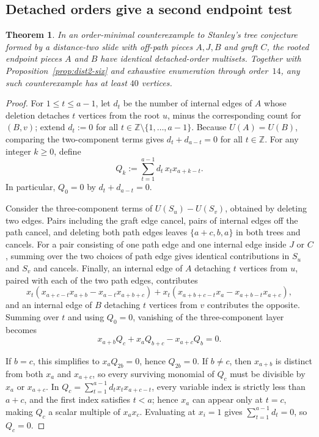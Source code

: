 \documentclass[10pt]{article}
\newtheorem{theorem}{Theorem}[section]
\begin{document}
\subsection{Detached orders give a second endpoint test}

\begin{theorem}\label{thm:dist2-bound}
In an order-minimal counterexample to Stanley's tree conjecture formed by a distance-two slide with off-path pieces $A,J,B$ and graft $C$, the rooted endpoint pieces $A$ and $B$ have identical detached-order multisets. Together with Proposition~\ref{prop:dist2-six} and exhaustive enumeration through order~$14$, any such counterexample has at least $40$ vertices.
\end{theorem}

\begin{proof}
For $1\le t\le a-1$, let $d_t$ be the number of internal edges of $A$ whose deletion detaches $t$ vertices from the root $u$, minus the corresponding count for $(B,v)$; extend $d_t := 0$ for all $t\in\mathbb{Z}\setminus\{1,\ldots,a-1\}$. Because $U(A)=U(B)$, comparing the two-component terms gives $d_t+d_{a-t}=0$ for all $t\in\mathbb{Z}$. For any integer $k\ge 0$, define
\[
Q_k := \sum_{t=1}^{a-1} d_t\, x_t x_{a+k-t}.
\]
In particular, $Q_0 = 0$ by $d_t+d_{a-t}=0$.

Consider the three-component terms of $U(S_u)-U(S_v)$, obtained by deleting two edges. Pairs including the graft edge cancel, pairs of internal edges off the path cancel, and deleting both path edges leaves $\{a+c,b,a\}$ in both trees and cancels. For a pair consisting of one path edge and one internal edge inside $J$ or $C$, summing over the two choices of path edge gives identical contributions in $S_u$ and $S_v$ and cancels. Finally, an internal edge of $A$ detaching $t$ vertices from $u$, paired with each of the two path edges, contributes
\[
x_t(x_{a+c-t}x_{a+b} - x_{a-t}x_{a+b+c}) + x_t(x_{a+b+c-t}x_a - x_{a+b-t}x_{a+c}),
\]
and an internal edge of $B$ detaching $t$ vertices from $v$ contributes the opposite. Summing over $t$ and using $Q_0=0$, vanishing of the three-component layer becomes
\[
x_{a+b}Q_c + x_a Q_{b+c} - x_{a+c}Q_b = 0.
\]

If $b=c$, this simplifies to $x_a Q_{2b}=0$, hence $Q_{2b}=0$. If $b\neq c$, then $x_{a+b}$ is distinct from both $x_a$ and $x_{a+c}$, so every surviving monomial of $Q_c$ must be divisible by $x_a$ or $x_{a+c}$. In $Q_c=\sum_{t=1}^{a-1} d_t x_t x_{a+c-t}$, every variable index is strictly less than $a+c$, and the first index satisfies $t<a$; hence $x_a$ can appear only at $t=c$, making $Q_c$ a scalar multiple of $x_a x_c$. Evaluating at $x_i=1$ gives $\sum_{t=1}^{a-1} d_t = 0$, so $Q_c=0$.


\end{proof}
\end{document}

